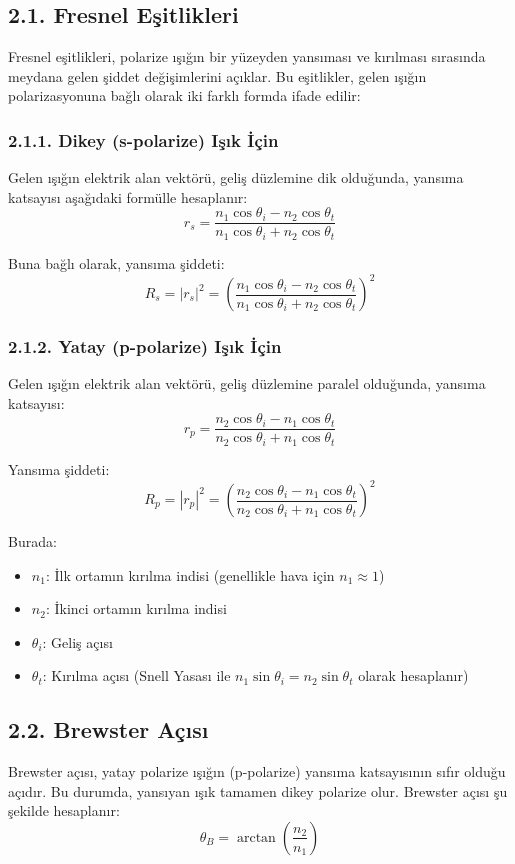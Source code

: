 \documentclass[11pt,letterpaper,twocolumn]{fenbil}
\begin{document}
\subsection*{2.1. Fresnel Eşitlikleri}
Fresnel eşitlikleri, polarize ışığın bir yüzeyden yansıması ve kırılması sırasında meydana gelen şiddet değişimlerini açıklar. Bu eşitlikler, gelen ışığın polarizasyonuna bağlı olarak iki farklı formda ifade edilir:

\subsubsection*{2.1.1. Dikey (s-polarize) Işık İçin}
Gelen ışığın elektrik alan vektörü, geliş düzlemine dik olduğunda, yansıma katsayısı aşağıdaki formülle hesaplanır:
\[
r_s = \frac{n_1 \cos{\theta_i} - n_2 \cos{\theta_t}}{n_1 \cos{\theta_i} + n_2 \cos{\theta_t}}
\]

Buna bağlı olarak, yansıma şiddeti:
\[
R_s = |r_s|^2 = \left(\frac{n_1 \cos{\theta_i} - n_2 \cos{\theta_t}}{n_1 \cos{\theta_i} + n_2 \cos{\theta_t}}\right)^2
\]

\subsubsection*{2.1.2. Yatay (p-polarize) Işık İçin}
Gelen ışığın elektrik alan vektörü, geliş düzlemine paralel olduğunda, yansıma katsayısı:
\[
r_p = \frac{n_2 \cos{\theta_i} - n_1 \cos{\theta_t}}{n_2 \cos{\theta_i} + n_1 \cos{\theta_t}}
\]

Yansıma şiddeti:
\[
R_p = |r_p|^2 = \left(\frac{n_2 \cos{\theta_i} - n_1 \cos{\theta_t}}{n_2 \cos{\theta_i} + n_1 \cos{\theta_t}}\right)^2
\]

Burada:
\begin{itemize}
    \item \( n_1 \): İlk ortamın kırılma indisi (genellikle hava için \( n_1 \approx 1 \))
    \item \( n_2 \): İkinci ortamın kırılma indisi
    \item \( \theta_i \): Geliş açısı
    \item \( \theta_t \): Kırılma açısı (Snell Yasası ile \( n_1 \sin{\theta_i} = n_2 \sin{\theta_t} \) olarak hesaplanır)
\end{itemize}

\subsection*{2.2. Brewster Açısı}
Brewster açısı, yatay polarize ışığın (p-polarize) yansıma katsayısının sıfır olduğu açıdır. Bu durumda, yansıyan ışık tamamen dikey polarize olur. Brewster açısı şu şekilde hesaplanır:
\[
\theta_B = \arctan{\left(\frac{n_2}{n_1}\right)}
\]
\end{document}
